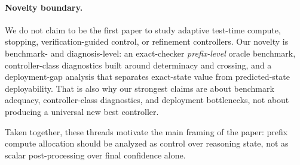 \paragraph{Novelty boundary.}
We do not claim to be the first paper to study adaptive test-time compute, stopping, verification-guided control, or refinement controllers.
Our novelty is benchmark- and diagnosis-level:
an exact-checker \emph{prefix-level} oracle benchmark, controller-class diagnostics built around determinacy and crossing, and a deployment-gap analysis that separates exact-state value from predicted-state deployability.
That is also why our strongest claims are about benchmark adequacy, controller-class diagnostics, and deployment bottlenecks, not about producing a universal new best controller.

Taken together, these threads motivate the main framing of the paper:
prefix compute allocation should be analyzed as control over reasoning state, not as scalar post-processing over final confidence alone.
